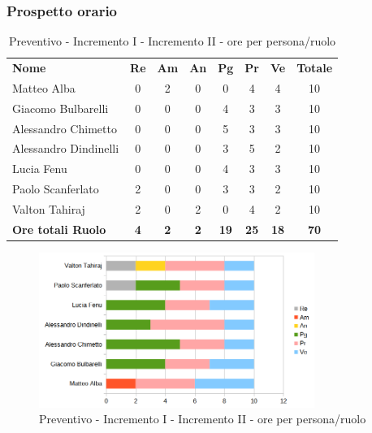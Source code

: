\subsubsection{Prospetto orario}

	\begin{table} [h!]
	\begin{center}
		\begin{tabular} { m{3.5cm} c c c c c c c }
			\rowcolor{lightgray}
			\textbf{Nome} & \textbf{Re} & \textbf{Am} & \textbf{An} & \textbf{Pg} & \textbf{Pr} & \textbf{Ve} & \textbf{Totale} \\
			Matteo Alba & 0&2 & 0& 0&4 & 4 & 10 \\
			Giacomo Bulbarelli & 0& 0& 0& 4 & 3 & 3 & 10 \\
			Alessandro Chimetto & 0& 0& 0& 5 & 3 & 3 & 10 \\
			Alessandro Dindinelli & 0& 0& 0& 3 & 5 &2 & 10 \\
			Lucia Fenu & 0& 0& 0& 4 & 3 & 3 & 10 \\
			Paolo Scanferlato &2 & 0& 0& 3 & 3 & 2 & 10 \\
			Valton Tahiraj & 2& 0&2 & 0& 4 & 2 & 10 \\
			\textbf{Ore totali Ruolo} & \textbf{4} & \textbf{2} & \textbf{2} & \textbf{19} & \textbf{25}& \textbf{18} & \textbf{70}
		\end{tabular}
		\caption{Preventivo - Incremento I - Incremento II - ore per persona/ruolo}
	\end{center}
\end{table}
	\begin{figure} [h!]
	\centering
	\includegraphics[width=0.8\textwidth]{res/img/preventivi/1e2-barre.png}
	\caption{Preventivo - Incremento I - Incremento II - ore per persona/ruolo} 
\end{figure}

\newpage

